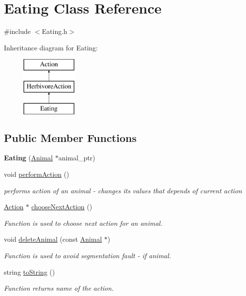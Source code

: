 \hypertarget{class_eating}{}\section{Eating Class Reference}
\label{class_eating}


{\ttfamily \#include $<$Eating.\+h$>$}

Inheritance diagram for Eating\+:\begin{figure}[H]
\begin{center}
\leavevmode
\includegraphics[height=3.000000cm]{class_eating}
\end{center}
\end{figure}
\subsection*{Public Member Functions}
\begin{DoxyCompactItemize}
\item 
\hypertarget{class_eating_a501ef632ad57bffad92d868530d77bd6}{}{\bfseries Eating} (\hyperlink{class_animal}{Animal} $\ast$animal\+\_\+ptr)\label{class_eating_a501ef632ad57bffad92d868530d77bd6}

\item 
void \hyperlink{class_eating_a0157edfea4cde8e596313d99c4b235be}{perform\+Action} ()
\begin{DoxyCompactList}\small\item\em performs action of an animal -\/ changes it\textquotesingle{}s values that depends of current action \end{DoxyCompactList}\item 
\hyperlink{class_action}{Action} $\ast$ \hyperlink{class_eating_aacfac2762df1da29e4555071e8720390}{choose\+Next\+Action} ()
\begin{DoxyCompactList}\small\item\em Function is used to choose next action for an animal. \end{DoxyCompactList}\item 
void \hyperlink{class_eating_a85cc0b93f26839dbf8c1344ce92c9e41}{delete\+Animal} (const \hyperlink{class_animal}{Animal} $\ast$)
\begin{DoxyCompactList}\small\item\em Function is used to avoid segmentation fault -\/ if animal. \end{DoxyCompactList}\item 
string \hyperlink{class_eating_a78e402536e59efec5e4643ffe0b4fd5a}{to\+String} ()
\begin{DoxyCompactList}\small\item\em Function returns name of the action. \end{DoxyCompactList}\end{DoxyCompactItemize}

